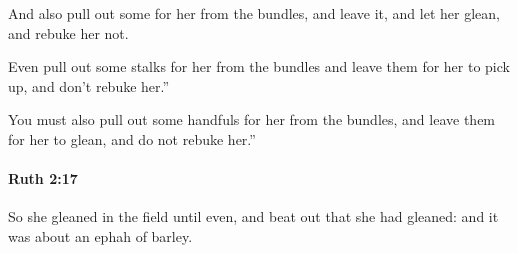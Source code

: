 			\begin{versebox}
					\item[BHS] 
					\item[LXX] 
					\item[ASV] And also pull out some for her from the bundles, and leave it, and let her glean, and rebuke her not.
					\item[NIV] Even pull out some stalks for her from the bundles and leave them for her to pick up, and don’t rebuke her.”
					\item[NRSV] You must also pull out some handfuls for her from the bundles, and leave them for her to glean, and do not rebuke her.”
			\end{versebox}

		\paragraph{Ruth 2:17} %
			\label{RUTH-2-17}

			So she gleaned in the field until even, and beat out that she had gleaned: and it was about an ephah of barley.


